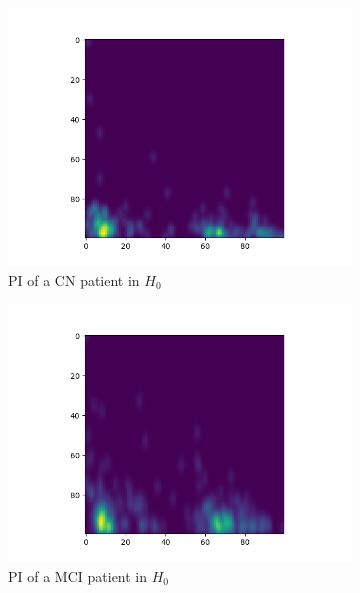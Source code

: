 \documentclass{article}
\begin{document}
\begin{figure}
  \centering
  \begin{subfigure}{0.32\textwidth}
    \includegraphics[width=\textwidth]{figures/PIs/Persistence_image_CN_h_0.png}
    \caption{PI of a CN patient in $H_0$}
  \end{subfigure}
  \begin{subfigure}{0.32\textwidth}
    \includegraphics[width=\textwidth]{figures/PIs/Persistence_image_MCI_h_0.png}
    \caption{PI of a MCI patient in $H_0$}
  \end{subfigure}
  \begin{subfigure}{0.32\textwidth}

\end{subfigure}
\end{figure}
\end{document}
